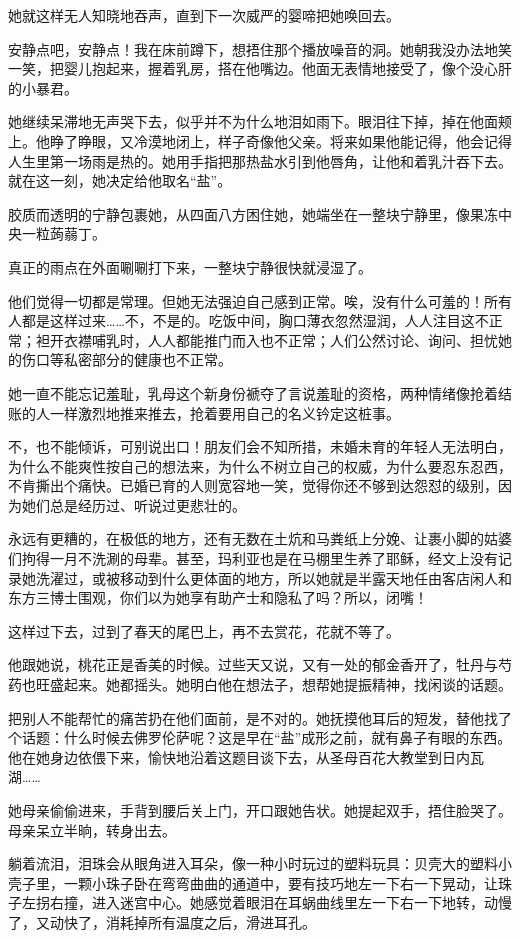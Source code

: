 \documentclass[lang=cn,newtx,12pt,scheme=chinese]{elegantbook}
\begin{document}
她就这样无人知晓地吞声，直到下一次威严的婴啼把她唤回去。

安静点吧，安静点！我在床前蹲下，想捂住那个播放噪音的洞。她朝我没办法地笑一笑，把婴儿抱起来，握着乳房，搭在他嘴边。他面无表情地接受了，像个没心肝的小暴君。

她继续呆滞地无声哭下去，似乎并不为什么地泪如雨下。眼泪往下掉，掉在他面颊上。他睁了睁眼，又冷漠地闭上，样子奇像他父亲。将来如果他能记得，他会记得人生里第一场雨是热的。她用手指把那热盐水引到他唇角，让他和着乳汁吞下去。就在这一刻，她决定给他取名“盐”。

胶质而透明的宁静包裹她，从四面八方困住她，她端坐在一整块宁静里，像果冻中央一粒蒟蒻丁。

真正的雨点在外面唰唰打下来，一整块宁静很快就浸湿了。

他们觉得一切都是常理。但她无法强迫自己感到正常。唉，没有什么可羞的！所有人都是这样过来……不，不是的。吃饭中间，胸口薄衣忽然湿润，人人注目这不正常；袒开衣襟哺乳时，人人都能推门而入也不正常；人们公然讨论、询问、担忧她的伤口等私密部分的健康也不正常。

她一直不能忘记羞耻，乳母这个新身份褫夺了言说羞耻的资格，两种情绪像抢着结账的人一样激烈地推来推去，抢着要用自己的名义钤定这桩事。

不，也不能倾诉，可别说出口！朋友们会不知所措，未婚未育的年轻人无法明白，为什么不能爽性按自己的想法来，为什么不树立自己的权威，为什么要忍东忍西，不肯撕出个痛快。已婚已育的人则宽容地一笑，觉得你还不够到达怨怼的级别，因为她们总是经历过、听说过更悲壮的。

永远有更糟的，在极低的地方，还有无数在土炕和马粪纸上分娩、让裹小脚的姑婆们拘得一月不洗涮的母辈。甚至，玛利亚也是在马棚里生养了耶稣，经文上没有记录她洗濯过，或被移动到什么更体面的地方，所以她就是半露天地任由客店闲人和东方三博士围观，你们以为她享有助产士和隐私了吗？所以，闭嘴！

这样过下去，过到了春天的尾巴上，再不去赏花，花就不等了。

他跟她说，桃花正是香美的时候。过些天又说，又有一处的郁金香开了，牡丹与芍药也旺盛起来。她都摇头。她明白他在想法子，想帮她提振精神，找闲谈的话题。

把别人不能帮忙的痛苦扔在他们面前，是不对的。她抚摸他耳后的短发，替他找了个话题：什么时候去佛罗伦萨呢？这是早在“盐”成形之前，就有鼻子有眼的东西。他在她身边依偎下来，愉快地沿着这题目谈下去，从圣母百花大教堂到日内瓦湖……

她母亲偷偷进来，手背到腰后关上门，开口跟她告状。她提起双手，捂住脸哭了。母亲呆立半晌，转身出去。

躺着流泪，泪珠会从眼角进入耳朵，像一种小时玩过的塑料玩具：贝壳大的塑料小壳子里，一颗小珠子卧在弯弯曲曲的通道中，要有技巧地左一下右一下晃动，让珠子左拐右撞，进入迷宫中心。她感觉着眼泪在耳蜗曲线里左一下右一下地转，动慢了，又动快了，消耗掉所有温度之后，滑进耳孔。
\end{document}
